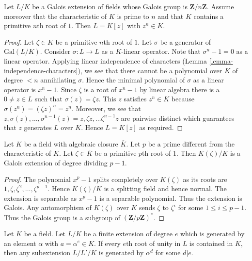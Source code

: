 \begin{lemma}
\label{lemma-Kummer}
Let $L/K$ be a Galois extension of fields whose Galois group is
$\mathbf{Z}/n\mathbf{Z}$. Assume moreover that the characteristic of $K$
is prime to $n$ and that $K$ contains a primitive $n$th root of $1$.
Then $L = K[z]$ with $z^n \in K$.
\end{lemma}

\begin{proof}
Let $\zeta \in K$ be a primitive $n$th root of $1$.
Let $\sigma$ be a generator of $\text{Gal}(L/K)$.
Consider $\sigma : L \to L$ as a $K$-linear operator.
Note that $\sigma^n - 1 = 0$ as a linear operator.
Applying linear independence of characters
(Lemma \ref{lemma-independence-characters}), we see
that there cannot be a polynomial over $K$ of degree $< n$
annihilating $\sigma$. Hence the minimal polynomial of $\sigma$
as a linear operator is $x^n - 1$. 
Since $\zeta$ is a root of $x^n - 1$ by linear algebra
there is a $0 \neq z \in L$ such that $\sigma(z) = \zeta z$.
This $z$ satisfies $z^n \in K$ because
$\sigma(z^n) = (\zeta z)^n = z^n$. Moreover, we see that
$z, \sigma(z), \ldots, \sigma^{n - 1}(z) =
z, \zeta z, \ldots \zeta^{n - 1} z$ are pairwise distinct
which guarantees that $z$ generates $L$ over $K$.
Hence $L = K[z]$ as required.
\end{proof}

\begin{lemma}
\label{lemma-adjoint-pth-root-unity}
Let $K$ be a field with algebraic closure $\overline{K}$.
Let $p$ be a prime different from the characteristic of $K$.
Let $\zeta \in \overline{K}$ be a primitive $p$th root
of $1$. Then $K(\zeta)/K$ is a Galois extension of degree dividing $p - 1$.
\end{lemma}

\begin{proof}
The polynomial $x^p - 1$ splits completely over
$K(\zeta)$ as its roots are $1, \zeta, \zeta^2, \ldots, \zeta^{p - 1}$.
Hence $K(\zeta)/K$ is a splitting field and hence normal.
The extension is separable as $x^p - 1$ is a separable polynomial.
Thus the extension is Galois. Any automorphism of $K(\zeta)$ over $K$
sends $\zeta$ to $\zeta^i$ for some $1 \leq i \leq p - 1$.
Thus the Galois group is a subgroup of $(\mathbf{Z}/p\mathbf{Z})^*$.
\end{proof}

\begin{lemma}
\label{lemma-subfields-kummer}
\begin{reference}
\cite[Theorem 5.2]{Radical}
\end{reference}
Let $K$ be a field. Let $L/K$ be a finite extension of degree $e$
which is generated by an element $\alpha$ with $a = \alpha^e \in K$.
If every $e$th root of unity in $L$ is contained in $K$, then 
any subextension $L/L'/K$ is generated by $\alpha^d$ for some $d | e$.
\end{lemma}

